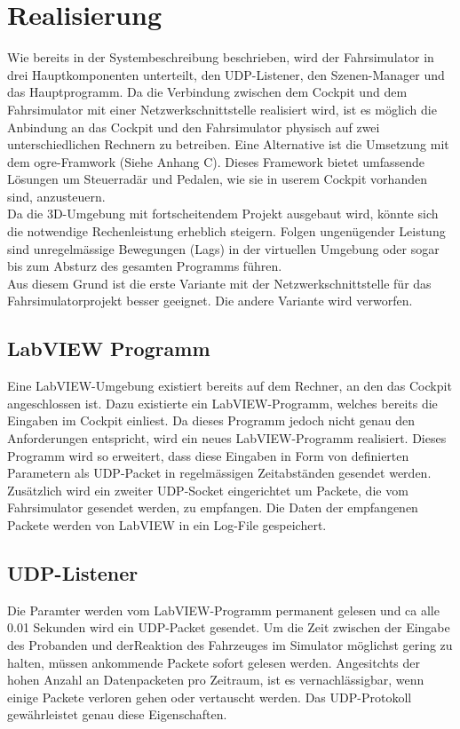 \section{Realisierung}
Wie bereits in der Systembeschreibung beschrieben, wird der Fahrsimulator in drei Hauptkomponenten unterteilt, den UDP-Listener, den Szenen-Manager und das Hauptprogramm. Da die Verbindung zwischen dem Cockpit und dem Fahrsimulator mit einer Netzwerkschnittstelle realisiert wird, ist es möglich die Anbindung an das Cockpit und den Fahrsimulator physisch auf zwei unterschiedlichen Rechnern zu betreiben. Eine Alternative ist die Umsetzung mit dem \gls{ogre}-Framwork (Siehe Anhang C). Dieses Framework bietet umfassende Lösungen um Steuerradär und Pedalen, wie sie in userem Cockpit vorhanden sind, anzusteuern.\\
Da die 3D-Umgebung mit fortscheitendem Projekt ausgebaut wird, könnte sich die notwendige Rechenleistung erheblich steigern. Folgen ungenügender Leistung sind unregelmässige Bewegungen (Lags) in der virtuellen Umgebung oder sogar bis zum Absturz des gesamten Programms führen.\\
Aus diesem Grund ist die erste Variante mit der Netzwerkschnittstelle für das Fahrsimulatorprojekt besser geeignet. Die andere Variante wird verworfen.
\subsection{LabVIEW Programm}
Eine LabVIEW-Umgebung existiert bereits auf dem Rechner, an den das Cockpit angeschlossen ist. Dazu existierte ein LabVIEW-Programm, welches bereits die Eingaben im Cockpit einliest. Da dieses Programm jedoch nicht genau den Anforderungen entspricht, wird ein neues LabVIEW-Programm realisiert. Dieses Programm wird so erweitert, dass diese Eingaben in Form von definierten Parametern als UDP-Packet in regelmässigen Zeitabständen gesendet werden. Zusätzlich wird ein zweiter UDP-Socket eingerichtet um Packete, die vom Fahrsimulator gesendet werden, zu empfangen. Die Daten der empfangenen Packete werden von LabVIEW in ein Log-File gespeichert.
\subsection{UDP-Listener}
\label{sec:udp-listener}
Die Paramter werden vom LabVIEW-Programm permanent gelesen und ca alle 0.01 Sekunden wird ein UDP-Packet gesendet. Um die Zeit zwischen der Eingabe des Probanden und derReaktion des Fahrzeuges im Simulator möglichst gering zu halten, müssen ankommende Packete sofort gelesen werden. Angesitchts der hohen Anzahl an Datenpacketen pro Zeitraum, ist es vernachlässigbar, wenn einige Packete verloren gehen oder vertauscht werden. Das UDP-Protokoll gewährleistet genau diese Eigenschaften.

